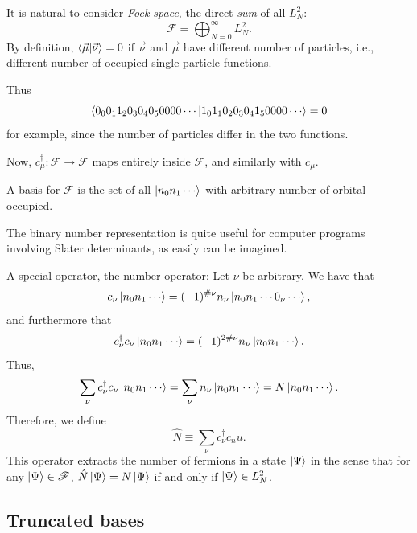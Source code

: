 \documentclass{report}
\theoremstyle{plain}
\theoremstyle{definition}
\begin{document}
It is natural to consider \emph{Fock space}, the direct \emph{sum} of
all $L^2_N$:
\begin{equation}
  \mathscr{F} = \bigoplus_{N=0}^\infty L^2_N.
\end{equation}
By definition, $\braket{\vec{\mu}|\vec{\nu}} = 0$ if $\vec{\nu}$ and
$\vec{\mu}$ have different number of particles, i.e., different number
of occupied single-particle functions.

Thus
\begin{equation}
  \braket{0_0 0_1 1_2 0_3 0_4 0_5 0000 \cdots|1_0 1_1 0_2 0_3 0_4 1_5 0000 \cdots} = 0
\end{equation}
for example, since the number of particles differ in the two
functions. 

Now, $c^\dag_\mu : \mathscr{F} \to \mathscr{F}$ maps entirely inside
$\mathscr{F}$, and similarly with $c_\mu$.

A basis for $\mathscr{F}$ is the set of all $\ket{n_0 n_1 \cdots}$
with arbitrary number of orbital occupied.

The binary number representation is quite useful for computer programs
involving Slater determinants, as easily can be imagined.


A special operator, the number operator:
Let $\nu$ be arbitrary. We have that
\begin{equation}
  c_\nu \ket{n_0 n_1 \cdots} = (-1)^{\#\nu} n_\nu \ket{n_0 n_1 \cdots
    0_\nu \cdots},
\end{equation}
and furthermore that
\begin{equation}
  c^\dag_\nu c_\nu \ket{n_0 n_1 \cdots} = (-1)^{2\#\nu} n_\nu \ket{n_0 n_1 \cdots}.
\end{equation}
Thus,
\begin{equation}
  \sum_{\nu} c^\dag_\nu c_\nu \ket{n_0 n_1 \cdots} = \sum_{\nu} n_\nu
  \ket{n_0 n_1\cdots} = N \ket{n_0 n_1 \cdots}.
\end{equation}
Therefore, we define
\begin{equation}
  \hat{N} \equiv \sum_\nu c^\dag_\nu c_nu.
\end{equation}
This operator extracts the number of fermions in a state $\ket{\Psi}$
in the sense that for any $\ket{\Psi} \in \mathscr{F}$, $\hat{N}\ket{\Psi} =
N\ket{\Psi}$ if and only if $\ket{\Psi} \in L^2_N$. 

\subsection{Truncated bases}
\end{document}
